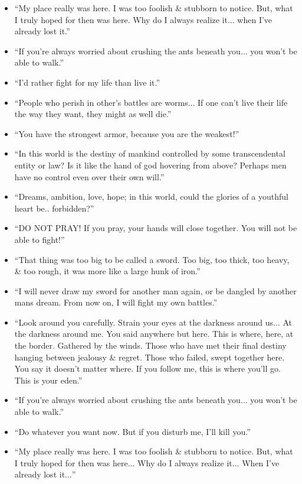 \documentclass{article}
\begin{document}
\begin{enumerate}
\begin{itemize}
    	\item ``My place really was here. I was too foolish \& stubborn to notice. But, what I truly hoped for then was here. Why do I always realize it$\ldots$ when I've already lost it.''
    	\item ``If you're always worried about crushing the ants beneath you$\ldots$ you won't be able to walk.''
    	\item ``I'd rather fight for my life than live it.''
    	\item ``People who perish in other's battles are worms$\ldots$ If one can't live their life the way they want, they might as well die.''
    	\item ``You have the strongest armor, because you are the weakest!''
    	\item ``In this world is the destiny of mankind controlled by some transcendental entity or law? Is it like the hand of god hovering from above? Perhaps men have no control even over their own will.''
    	\item ``Dreams, ambition, love, hope; in this world, could the glories of a youthful heart be.. forbidden?''
    	\item ``DO NOT PRAY! If you pray, your hands will close together. You will not be able to fight!''
    	\item ``That thing was too big to be called a sword. Too big, too thick, too heavy, \& too rough, it was more like a large hunk of iron.''
    	\item ``I will never draw my sword for another man again, or be dangled by another mans dream. From now on, I will fight my own battles.''
    	\item ``Look around you carefully. Strain your eyes at the darkness around us$\ldots$ At the darkness around me. You said anywhere but here. This is where, here, at the border. Gathered by the winds. Those who have met their final destiny hanging between jealousy \& regret. Those who failed, swept together here. You say it doesn't matter where. If you follow me, this is where you'll go. This is your eden.''
    	\item ``If you're always worried about crushing the ants beneath you$\ldots$ you won't be able to walk.''
    	\item ``Do whatever you want now. But if you disturb me, I'll kill you.''
    	\item ``My place really was here. I was too foolish \& stubborn to notice. But, what I truly hoped for then was here$\ldots$ Why do I always realize it$\ldots$ When I've already lost it$\ldots$''

\end{itemize}
\end{enumerate}
\end{document}
